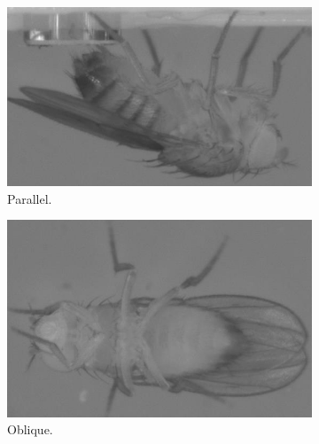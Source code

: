 \begin{figure}[ht!]
	\centering
	\begin{subfigure}[b]{0.325\linewidth}
		\centering\includegraphics[width=\linewidth]{figures/FlyOrientation-ParallelHorizontal.png}
		\caption{Parallel.\label{figure:parallel-horizontal-orientation}}
	\end{subfigure}%
	\hfill
	\begin{subfigure}[b]{0.3\linewidth}
		\centering\includegraphics[width=\linewidth]{figures/FlyOrientation-Oblique.png}
		\caption{Oblique.\label{figure:oblique-orientation}}
	\end{subfigure}%
	\hfill
	\begin{subfigure}[b]{0.3\linewidth}

\end{subfigure}
\end{figure}
